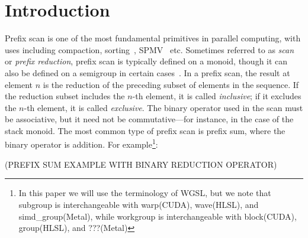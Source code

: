 \documentclass[sigconf]{acmart}
\begin{document}



\maketitle

\section{Introduction}
Prefix scan is one of the most fundamental primitives in parallel computing, with uses including compaction, sorting~\cite{10.1145/3035918.3064043, adinets2022onesweepfastersignificantdigit}, SPMV~\cite{} etc. Sometimes referred to as \emph{scan} or \emph{prefix reduction}, prefix scan is typically defined on a monoid, though it can also be defined on a semigroup in certain cases~\cite{10.1007/978-3-540-27764-4_11}. In a prefix scan, the result at element $n$ is the reduction of the preceding subset of elements in the sequence. If the reduction subset includes the $n$-th element, it is called \emph{inclusive}; if it excludes the $n$-th element, it is called \emph{exclusive}. The binary operator used in the scan must be associative, but it need not be commutative—for instance, in the case of the stack monoid. The most common type of prefix scan is prefix sum, where the binary operator is addition. For example\footnote{In this paper we will use the terminology of WGSL, but we note that subgroup is interchangeable with warp(CUDA), wave(HLSL), and simd\_group(Metal), while workgroup is interchangeable with block(CUDA), group(HLSL), and ???(Metal)}:

(PREFIX SUM EXAMPLE WITH BINARY REDUCTION OPERATOR)
\end{document}

